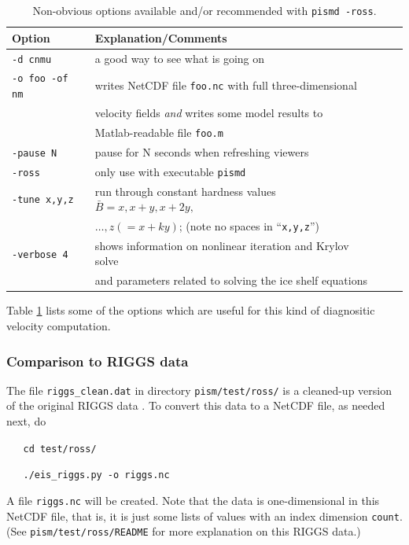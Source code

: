 \documentclass[11pt,final]{amsart}
\begin{document}
\small
\begin{table}[ht]
\caption{Non-obvious options available and/or recommended with \texttt{pismd -ross}.}\label{tab:rossoptions}
\begin{tabular}{@{}llll}\hline
\textbf{Option} & \textbf{Explanation/Comments} \\ \hline
  \verb|-d cnmu| &       a good way to see what is going on \\
  \verb|-o foo -of nm| &  writes NetCDF file \verb|foo.nc| with full three-dimensional \\
    & velocity fields \emph{and} writes some model results to \\
    & Matlab-readable file \verb|foo.m| \\
  \verb|-pause N| &      pause for N seconds when refreshing viewers \\
  \verb|-ross| &         only use with executable \verb|pismd| \\
  \verb|-tune x,y,z| &   run through constant hardness values $\bar B = x, x+y, x+2y,$ \\
 & $\dots, z(=x+ky)$; (note no spaces in ``\verb|x,y,z|'') \\
  \verb|-verbose 4| &      shows information on nonlinear iteration and Krylov solve \\
    & and parameters related to solving the ice shelf equations \\
\hline
\end{tabular}
\end{table}
\normalsize

Table \ref{tab:rossoptions} lists some of the options which are useful for this kind of diagnositic velocity computation.

\subsubsection*{Comparison to RIGGS data}  The file \verb|riggs_clean.dat| in directory \verb|pism/test/ross/| is a cleaned-up version of the original RIGGS data \cite{RIGGS1, RIGGS2}.  To convert this data to a NetCDF file, as needed next, do

\verb|   cd test/ross/|

\verb|   ./eis_riggs.py -o riggs.nc|

\noindent A file \verb|riggs.nc| will be created.  Note that the data is one-dimensional in this NetCDF file, that is, it is just some lists of values with an index dimension \verb|count|.  (See \verb|pism/test/ross/README| for more explanation on this RIGGS data.)
\end{document}
